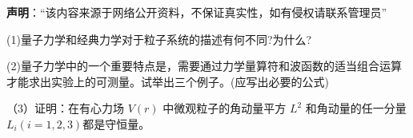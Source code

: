 
\textbf{声明}：“该内容来源于网络公开资料，不保证真实性，如有侵权请联系管理员”

(1)量子力学和经典力学对于粒子系统的描述有何不同?为什么?

(2)量子力学中的一个重要特点是，需要通过力学量算符和波函数的适当组合运算才能求出实验上的可测量。试举出三个例子。(应写出必要的公式)

（3）证明：在有心力场 $V(r)$ 中微观粒子的角动量平方 $ L^2 $ 和角动量的任一分量 $L_i (i=1,2,3)$都是守恒量。